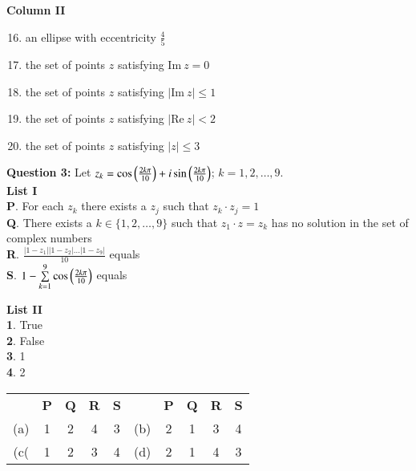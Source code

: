 \documentclass[journal,12pt,twocolumn]{IEEEtran}
\theoremstyle{remark}
\newcommand{\RE}{\mathrm{Re}}
\newcommand{\IM}{\mathrm{Im}}
\begin{document}
\begin{flushright}
\textbf{Column II}

\begin{enumerate}[label=(\alph*)]
\setcounter{enumi}{15}
\item an ellipse with eccentricity $\frac 4 5$
\item the set of points $z$ satisfying $\IM\ z = 0$
\item the set of points $z$ satisfying $|\IM\ z| \le 1$
\item the set of points $z$ satisfying $|\RE\ z| < 2$
\item the set of points $z$ satisfying $|z| \le 3$
\end{enumerate}
\end{flushright}

\textbf{Question 3:} Let $z_k = \cos\left(\frac {2k\pi} {10}\right) + i\sin\left(\frac {2k\pi} {10}\right)$; $k = 1,2,\dots,9$.
\hspace*{\fill} {\color{magenta}} \\

\textbf{List I} \\
\textbf P. For each $z_k$ there exists a $z_j$ such that $z_k \cdot z_j = 1$ \\
\textbf Q. There exists a $k \in \{1,2,\dots, 9\}$ such that $z_1 \cdot z = z_k$ has no 
solution in the set of complex numbers \\
\textbf R. $\frac {|1 - z_1||1 - z_2|\dots|1-z_9|} {10}$ equals \\
\textbf S. $1 - \sum\limits_{k=1}^9 \cos \left(\frac {2k\pi} {10}\right)$ equals \\

\begin{flushright}
\textbf{List II} \\
\textbf 1. True \\
\textbf 2. False \\
\textbf 3. 1 \\
\textbf 4. 2 \\
\end{flushright}

\begin{tabular}{c c c c c c c c c c}
	& \textbf P & \textbf Q & \textbf R & \textbf S & & \textbf P & \textbf Q & \textbf R & \textbf S \\
	(a) & 1 & 2 & 4 & 3 & (b) & 2 & 1 & 3 & 4 \\
	(c( & 1 & 2 & 3 & 4 & (d) & 2 & 1 & 4 & 3 \\
\end{tabular}
\end{document}
